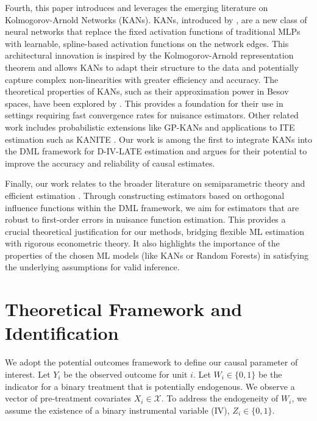 \documentclass[final,3p,fleqn, 10pt]{elsarticle}
\begin{document}
Fourth, this paper introduces and leverages the emerging literature on Kolmogorov-Arnold Networks (KANs). KANs, introduced by \citet{liu2024kan}, are a new class of neural networks that replace the fixed activation functions of traditional MLPs with learnable, spline-based activation functions on the network edges. This architectural innovation is inspired by the Kolmogorov-Arnold representation theorem and allows KANs to adapt their structure to the data and potentially capture complex non-linearities with greater efficiency and accuracy. The theoretical properties of KANs, such as their approximation power in Besov spaces, have been explored by \citet{kratsios2025kolmogorov}. This provides a foundation for their use in settings requiring fast convergence rates for nuisance estimators. Other related work includes probabilistic extensions like GP-KANs \citep{chen2025gpkan} and applications to ITE estimation such as KANITE \citep{mehendale2025kanite}. Our work is among the first to integrate KANs into the DML framework for D-IV-LATE estimation and argues for their potential to improve the accuracy and reliability of causal estimates.

Finally, our work relates to the broader literature on semiparametric theory and efficient estimation \citep{bickel1993efficient, newey1994asymptotic}. Through constructing estimators based on orthogonal influence functions within the DML framework, we aim for estimators that are robust to first-order errors in nuisance function estimation. This provides a crucial theoretical justification for our methods, bridging flexible ML estimation with rigorous econometric theory. It also highlights the importance of the properties of the chosen ML models (like KANs or Random Forests) in satisfying the underlying assumptions for valid inference.

\section{Theoretical Framework and Identification}
\label{sec:framework}

We adopt the potential outcomes framework to define our causal parameter of interest. Let $Y_i$ be the observed outcome for unit $i$. Let $W_i \in \{0, 1\}$ be the indicator for a binary treatment that is potentially endogenous. We observe a vector of pre-treatment covariates $X_i \in \mathcal{X}$. To address the endogeneity of $W_i$, we assume the existence of a binary instrumental variable (IV), $Z_i \in \{0, 1\}$.
\end{document}

